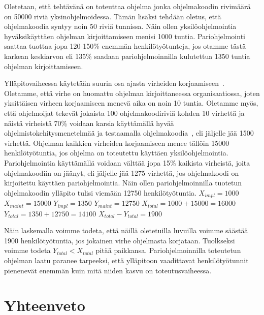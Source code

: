 \documentclass[finnish]{tktltiki2}
\theoremstyle{definition}
\theoremstyle{remark}
\begin{document}
Oletetaan, että tehtävänä on toteuttaa ohjelma jonka ohjelmakoodin rivimäärä on 50000 riviä yksinohjelmoidessa. Tämän lisäksi tehdään oletus, että ohjelmakoodia syntyy noin 50 riviä tunnissa. Näin ollen yksilöohjelmointia hyväksikäyttäen ohjelman kirjoittamiseen menisi 1000 tuntia. Pariohjelmointi saattaa tuottaa jopa 120-150\% enemmän henkilötyötunteja, jos otamme tästä karkean keskiarvon eli 135\% saadaan pariohjelmoinnilla kulutettua 1350 tuntia ohjelman kirjoittamiseen.

Ylläpitovaiheessa käytetään suurin osa ajasta virheiden korjaamiseen~\cite{costandbenefit2}. Oletamme, että virhe on huomattu ohjelman kirjoittaneessa organisaatiossa, joten yksittäisen virheen korjaamiseen menevä aika on noin 10 tuntia. Oletamme myös, että ohjelmoijat tekevät jokaista 100 ohjelmakoodiriviä kohden 10 virhettä ja näistä virheistä 70\% voidaan karsia käyttämällä hyvää ohjelmistokehitysmenetelmää ja testaamalla ohjelmakoodia~\cite{costandbenefit2}, eli jäljelle jää 1500 virhettä. Ohjelman kaikkien virheiden korjaamiseen menee tällöin 15000 henkilötyötuntia, jos ohjelma on toteutettu käyttäen yksilöohjelmointia. Pariohjelmointia käyttämällä voidaan välttää jopa 15\% kaikista virheistä, joita ohjelmakoodiin on jäänyt, eli jäljelle jää 1275 virhettä, jos ohjelmakoodi on kirjoitettu käyttäen pariohjelmointia. Näin ollen pariohjelmoinnilla tuotetun ohjelmakoodin ylläpito tulisi viemään 12750 henkilötyötuntia.\newline
$X_{impl} = 1000$\newline
$X_{maint} = 15000$\newline
$Y_{impl} = 1350$\newline
$Y_{maint} =12750$\newline
$X_{total} = 1000 + 15000 =16000 $\newline
$Y_{total} = 1350 + 12750 = 14100 $\newline
$X_{total}-Y_{total} = 1900$\newline

Näin laskemalla voimme todeta, että näillä oletetuilla luvuilla voimme säästää 1900 henkilötyötuntia, jos jokainen virhe ohjelmasta korjataan. Tuolkseksi voimme todeta $ Y_{total} < X_{total}$ pitää paikkansa. Pariohjelmoinnilla toteutetun ohjelman laatu paranee tarpeeksi, että ylläpitoon vaadittavat henkilötyötunnit pienenevät enemmän kuin mitä niiden kasvu on toteutusvaiheessa.

\section{Yhteenveto}
\end{document}
